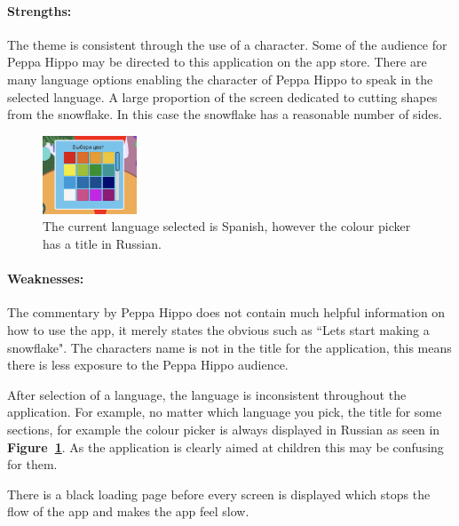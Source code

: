 \documentclass[11pt]{article}
\begin{document}
                \paragraph{Strengths:}
                The theme is consistent through the use of a character. Some of the audience for Peppa Hippo may be directed to this application on the app store. There are many language options enabling the character of Peppa Hippo to speak in the selected language. A large proportion of the screen dedicated to cutting shapes from the snowflake. In this case the snowflake has a reasonable number of sides. 

                \begin{figure}
                    \includegraphics[width=0.25\textwidth]{Images/peppa/peppaRussian}
                    \caption{The current language selected is Spanish, however the colour picker has a title in Russian.}
                    \label{fig:peppaRussian}
                \end{figure}
                \paragraph{Weaknesses:}
                The commentary by Peppa Hippo does not contain much helpful information on how to use the app, it merely states the obvious such as ``Lets start making a snowflake". The characters name is not in the title for the application, this means there is less exposure to the Peppa Hippo audience.
                
                After selection of a language, the language is inconsistent throughout the application. For example, no matter which language you pick, the title for some sections, for example the colour picker is always displayed in Russian as seen in \textbf{Figure~\ref{fig:peppaRussian}}.  As the application is clearly aimed at children this may be confusing for them.
                
                There is a black loading page before every screen is displayed which stops the flow of the app and makes the app feel slow.
\end{document}
